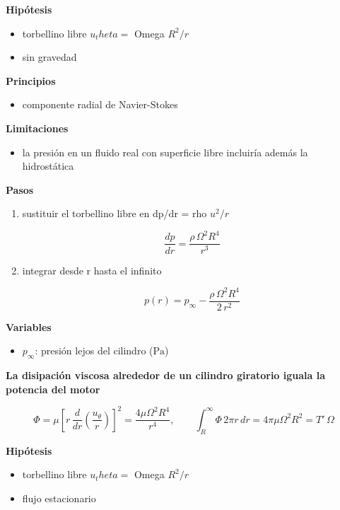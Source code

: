 \documentclass[10pt,openany]{book}
\begin{document}
\begin{tcolorbox}[title={Desarrollos del modelo}, studiumdef, breakable]
\noindent\textbf{Hipótesis}
\begin{itemize}
\item torbellino libre \(u_theta =\) Omega \(R^2/r\)
\item sin gravedad
\end{itemize}

\noindent\textbf{Principios}
\begin{itemize}
\item componente radial de Navier-Stokes
\end{itemize}

\noindent\textbf{Limitaciones}
\begin{itemize}
\item la presión en un fluido real con superficie libre incluiría además la hidrostática
\end{itemize}

\noindent\textbf{Pasos}
\begin{enumerate}
\item
sustituir el torbellino libre en dp/dr = rho \(u^2/r\)

\[
\frac{dp}{dr} = \frac{\rho\,\Omega^{2}R^{4}}{r^{3}}
\]
\item
integrar desde r hasta el infinito

\[
p(r) = p_\infty - \frac{\rho\,\Omega^{2}R^{4}}{2\,r^{2}}
\]
\end{enumerate}

\noindent\textbf{Variables}
\begin{itemize}
\item $p_\infty$: presión lejos del cilindro ($\mathrm{Pa}$)
\end{itemize}



\noindent\textbf{La disipación viscosa alrededor de un cilindro giratorio iguala la potencia del motor}

\begin{equation}
\Phi = \mu\left[r\,\frac{d}{dr}\!\left(\frac{u_\theta}{r}\right)\right]^{2} = \frac{4\mu\Omega^{2}R^{4}}{r^{4}},\qquad \int_R^{\infty}\Phi\,2\pi r\,dr = 4\pi\mu\Omega^{2}R^{2} = T'\,\Omega
\label{eq:c14-disipacion-cilindro}
\end{equation}

\noindent\textbf{Hipótesis}
\begin{itemize}
\item torbellino libre \(u_theta =\) Omega \(R^2/r\)
\item flujo estacionario
\end{itemize}


\end{tcolorbox}
\end{document}
